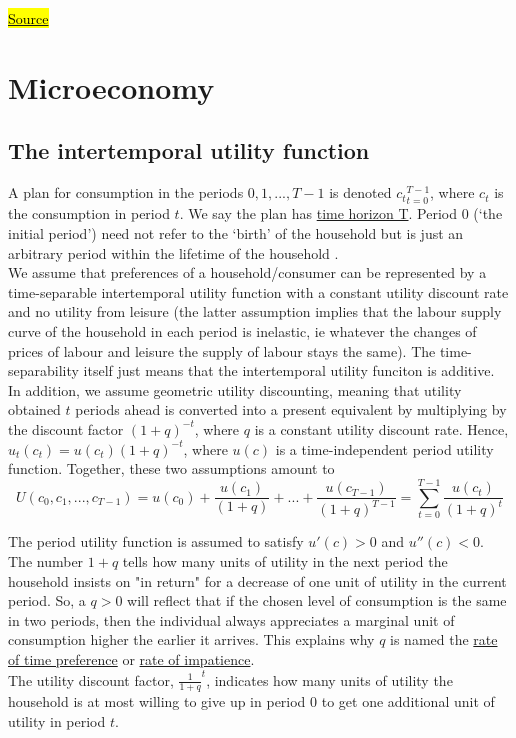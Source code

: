 \documentclass[a4paper, 12pt, reqno]{article}
\begin{document}
\href{https://www.lancaster.ac.uk/staff/desilvad/Varian9e_LecturePPTs_Ch08.pdf}{\hl{Source}}

\section{Microeconomy}
\subsection{The intertemporal utility function}
A plan for consumption in the periods $0, 1, ... , T-1$ is denoted ${c_t}^{T-1}_{t=0}$, where $c_t$ is the consumption in period $t$. We say the plan has \underline{time horizon T}. 
Period 0 (‘the initial period’) need not refer to the ‘birth’ of the household but is just an arbitrary period within the lifetime of the household . \\

We assume that preferences of a household/consumer can be represented by a time-separable intertemporal utility function with a constant utility discount rate and no utility from 
leisure (the latter assumption implies that the labour supply curve of the household in each period is inelastic, ie whatever the changes of prices of labour and leisure the supply of labour stays the same). 
The time-separability itself just means that the intertemporal utility funciton is additive.  \\ 
In addition, we assume geometric utility discounting, meaning that utility obtained $t$ periods ahead is converted into a present equivalent by multiplying by the discount factor $(1 + q)^{-t}$, where $q$ 
is a constant utility discount rate. Hence, $u_t(c_t) = u(c_t)(1 + q)^{-t} $, where $u(c)$ is a time-independent period utility function. Together, these two assumptions amount to
$$ U(c_0, c_1, ..., c_{T-1}) = u(c_0) + \frac{u(c_1)}{(1+q)} + ... +  \frac{u(c_{T -1})}{(1+q)^{T-1}} = \sum_{t = 0}^{T - 1} \frac{u(c_{t})}{(1+q)^{t}} $$

The period utility function is assumed to satisfy $u'(c) > 0 $ and $u''(c) < 0 $.  \\ 
The number $ 1 + q$ tells how many units of utility in the next period the household insists on "in return" for a decrease of one unit of utility in the current period. 
So, a $q > 0$ will reflect that if the chosen level of consumption is the same in two periods, then the individual always appreciates a marginal unit of consumption higher the earlier it arrives. 
This explains why $q$ is named the \underline{rate of time preference} or \underline{rate of impatience}. \\ The utility discount factor, $\frac{1}{1+q}^t$, indicates how many units of utility the household is at most willing to give up 
in period 0 to get one additional unit of utility in period $t$.
\end{document}
